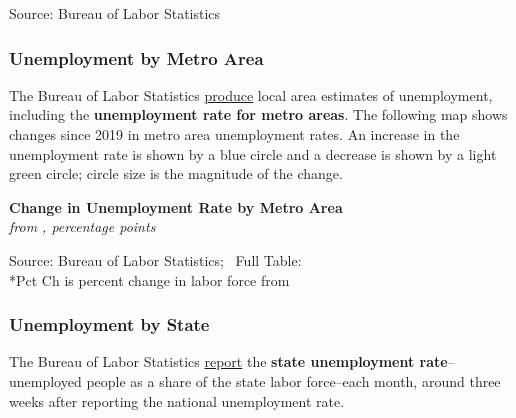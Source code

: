 \documentclass{report}
\newcommand{\tbllink}[1]{\href{https://raw.githubusercontent.com/bdecon/US-chartbook/master/chartbook/data/#1}{\faTable}}
\begin{document}
{\begin{minipage}{0.76\textwidth}
\footnotesize{Source: Bureau of Labor Statistics} \hfill \tbllink{unempdur.csv}
\end{minipage}
\newpage
\begin{minipage}{0.76\textwidth} 
\subsubsection*{Unemployment by Metro Area}
\vspace{-1mm}

\small The Bureau of Labor Statistics \href{https://www.bls.gov/lau/}{produce} local area estimates of unemployment, including the \textbf{unemployment rate for metro areas}. The following map shows changes since 2019 in metro area unemployment rates. An increase in the unemployment rate is shown by a blue circle and a decrease is shown by a light green circle; circle size is the magnitude of the change. 


\end{minipage}
\vspace{1mm}

\begin{minipage}{0.82\textwidth}
\normalsize \textbf{Change in Unemployment Rate by Metro Area}\\
\footnotesize{\textit{from \unskip, percentage points}}
\vspace{-3mm}

\hspace*{-8mm} 
\vspace{-3mm}

\footnotesize{Source: Bureau of Labor Statistics; \ Full Table: \tbllink{msa_unemp_rate.csv} \\ \**Pct Ch is percent change in labor force from }
\end{minipage}
\newpage
\begin{minipage}{0.76\textwidth} 
\subsubsection*{Unemployment by State}
\small The Bureau of Labor Statistics \href{https://www.bls.gov/lau/}{report} the \textbf{state unemployment rate}--unemployed people as a share of the state labor force--each month, around three weeks after reporting the national unemployment rate. 


\end{minipage}}
\end{document}
